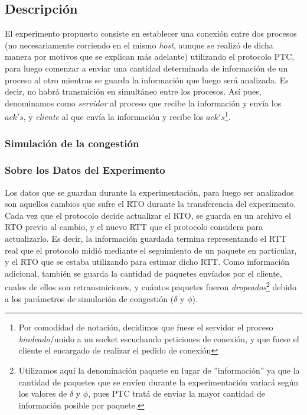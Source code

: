 \subsection{Descripci\'on}\label{sec:experimento:descripcion}
\par El experimento propuesto consiste en establecer una conexi\'on entre dos
procesos (no necesariamente corriendo en el mismo \textit{host}, aunque se
realiz\'o de dicha manera por motivos que se explican m\'as adelante) utilizando
el protocolo PTC, para luego comenzar a enviar una cantidad determinada de
informaci\'on de un proceso al otro mientras se guarda la informaci\'on que
luego ser\'a analizada. Es decir, no habr\'a transmici\'on en simult\'aneo entre
los procesos. As\'i pues, denominamos como \emph{servidor} al proceso que recibe
la informaci\'on y env\'ia los $ack's$, y \emph{cliente} al que env\'ia la
informaci\'on y recibe los $ack's$\footnote{Por comodidad de notaci\'on, decidimos
que fuese el servidor el proceso \textit{bindeado}/unido a un socket escuchando
peticiones de conexi\'on, y que fuese el cliente el encargado de realizar el
pedido de conexi\'on}.

\subsubsection*{Simulaci\'on de la congesti\'on}

\subsubsection*{Sobre los Datos del Experimento}
\par Los datos que se guardan durante la experimentaci\'on, para luego ser
analizados son aquellos cambios que sufre el RTO durante la transferencia del
experimento. Cada vez que el protocolo decide actualizar el RTO, se guarda
en un archivo el RTO previo al cambio, y el nuevo RTT que el protocolo considera
para actualizarlo. Es decir, la informaci\'on guardada termina representando
el RTT real que el protocolo midi\'o mediante el seguimiento de un paquete en
particular, y el RTO que se estaba utilizando para estimar dicho RTT. Como
informaci\'on adicional, tambi\'en se guarda la cantidad de paquetes env\'iados
por el cliente, cuales de ellos son retransmiciones, y cu\'antos paquetes
fueron \emph{dropeados}\footnote{Utilizamos aqu\'i la denominaci\'on paquete
en lugar de ''informaci\'on'' ya que la cantidad de paquetes que se env\'ien
durante la experimentaci\'on variar\'a seg\'un los valores de $\delta$ y $\phi$,
pues PTC trat\'a de enviar la mayor cantidad de informaci\'on posible por paquete.}
debido a los par\'ametros de simulaci\'on de congesti\'on ($\delta$ y $\phi$).

